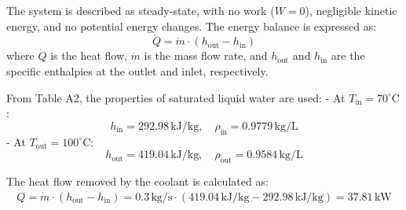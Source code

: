 The system is described as steady-state, with no work (\( W = 0 \)), negligible kinetic energy, and no potential energy changes. The energy balance is expressed as:  
\[
\dot{Q} = \dot{m} \cdot (h_{\text{out}} - h_{\text{in}})
\]  
where \( \dot{Q} \) is the heat flow, \( \dot{m} \) is the mass flow rate, and \( h_{\text{out}} \) and \( h_{\text{in}} \) are the specific enthalpies at the outlet and inlet, respectively.  

From Table A2, the properties of saturated liquid water are used:  
- At \( T_{\text{in}} = 70^\circ\text{C} \):  
  \[
  h_{\text{in}} = 292.98 \, \text{kJ/kg}, \quad \rho_{\text{in}} = 0.9779 \, \text{kg/L}
  \]  
- At \( T_{\text{out}} = 100^\circ\text{C} \):  
  \[
  h_{\text{out}} = 419.04 \, \text{kJ/kg}, \quad \rho_{\text{out}} = 0.9584 \, \text{kg/L}
  \]  

The heat flow removed by the coolant is calculated as:  
\[
\dot{Q} = \dot{m} \cdot (h_{\text{out}} - h_{\text{in}}) = 0.3 \, \text{kg/s} \cdot (419.04 \, \text{kJ/kg} - 292.98 \, \text{kJ/kg}) = 37.81 \, \text{kW}
\]